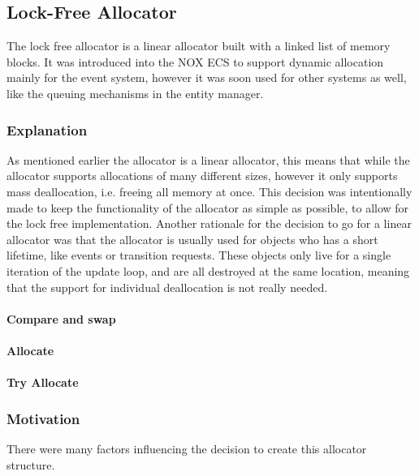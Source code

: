 \subsection{Lock-Free Allocator}
\label{subsec:detailed_lock_free_allocator}
The lock free allocator is a linear allocator built with a linked list of memory blocks.
It was introduced into the NOX ECS to support dynamic allocation mainly for the event system,
however it was soon used for other systems as well, like the queuing mechanisms in the entity manager.

\subsubsection{Explanation}
As mentioned earlier the allocator is a linear allocator,
this means that while the allocator supports allocations of many different sizes,
however it only supports mass deallocation, i.e. freeing all memory at once.
This decision was intentionally made to keep the functionality of the allocator as simple
as possible, to allow for the lock free implementation.
Another rationale for the decision to go for a linear allocator was that the allocator
is usually used for objects who has a short lifetime, like events or transition requests.
These objects only live for a single iteration of the update loop, and are all destroyed at
the same location, meaning that the support for individual deallocation is not really needed.

\paragraph{Compare and swap}

\paragraph{Allocate}


\paragraph{Try Allocate}


\subsubsection{Motivation}
There were many factors influencing the decision to create this allocator structure.


